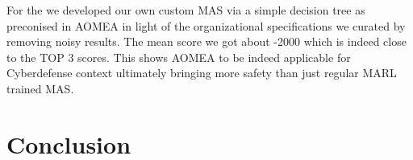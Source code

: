 \documentclass[runningheads]{llncs}
\begin{document}
For the  we developed our own custom MAS via a simple decision tree as preconised in AOMEA in light of the organizational specifications we curated by removing noisy results. The mean score we got about -2000 which is indeed close to the TOP 3 scores. This shows AOMEA to be indeed applicable for Cyberdefense context ultimately bringing more safety than just regular MARL trained MAS.

\section{Conclusion}




\end{document}

